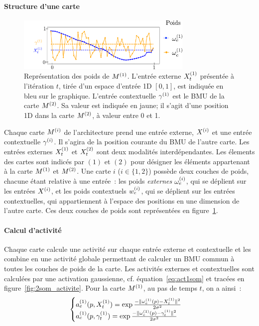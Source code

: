 \documentclass[../main]{subfiles}
\begin{document}
\paragraph{Structure d'une carte}
\begin{figure}
    \centering
    \includegraphics[width=0.75\textwidth]{weights_2som.pdf}
    \caption{Représentation des poids de $M^{({1})}$. L'entrée externe $X_t^{({1})}$ présentée à l'itération $t$, tirée d'un espace d'entrée 1D $[0,1]$, est indiquée en bleu sur le graphique. L'entrée contextuelle $\gamma^{({1})}$ est le BMU de la carte $M^{({2})}$. Sa valeur est indiquée en jaune; il s'agit d'une position 1D dans la carte $M^{({2})}$, à valeur entre 0 et 1. \label{fig:2som_weights}}
    \end{figure}
Chaque carte $M^{({i})}$ de l'architecture prend une entrée externe, $X^{({i})}$ et une entrée contextuelle $\gamma^{({i})}$. Il s'agira de la position courante du BMU de l'autre carte.
Les entrées externes $X^{({1})}_t$ et $X^{({2})}_t$ sont deux modalités interdépendantes.
Les élements des cartes sont indicés par $(1)$ et $(2)$ pour désigner les éléments appartenant à la carte $M^{({1})}$ et $M^{({2})}$.
Une carte $i$ ($i \in \{1,2\}$) possède deux couches de poids, chacune étant relative à une entrée~: les poids \emph{externes} $\omega_e^{({i})}$, qui se déplient sur les entrées $X^{({i})}$, et les poids contextuels $w_c^{({i})}$, qui se déplient sur les entrées contextuelles, qui appartiennent à l'espace des positions en une dimension de l'autre carte. 
Ces deux couches de poids sont représentées en figure~\ref{fig:2som_weights}. 

\paragraph{Calcul d'activité}

Chaque carte calcule une activité sur chaque entrée externe et contextuelle et les combine en une activité globale permettant de calculer un BMU commun à toutes les couches de poids de la carte.
Les activités externes et contextuelles sont calculées par une activation gaussienne, cf. équation~\ref{eq:act1som} et tracées en figure~\ref{fig:2som_activite}.
Pour la carte $M^{({1})}$, au pas de temps $t$, on a ainsi~:
\begin{equation}
\label{eq:activite}
\begin{cases}
a_e^{({1})}(p, X_t^{({1})}) = \exp\frac{-\lVert \omega_e^{({1})}(p)-X^{({1})}_t \rVert^2}{2\sigma^2} \\
a_c^{({1})}(p, \gamma^{({1})}_t) = \exp\frac{-\lVert \omega_c^{({1})}(p)-\gamma^{({1})}_t \rVert ^2}{2\sigma^2}\\
\end{cases}
\end{equation}
\end{document}
